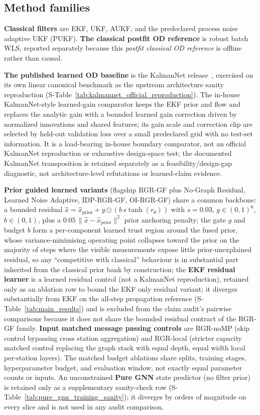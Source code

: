 \documentclass{article}
\begin{document}
\subsection{Method families}\label{sec:methods-families}
\textbf{Classical filters} are EKF, UKF, AUKF, and the predeclared process noise adaptive UKF (PUKF). \textbf{The classical postfit OD reference} is robust batch WLS, reported separately because this \emph{postfit classical OD reference} is offline rather than causal.

\textbf{The published learned OD baseline} is the KalmanNet release~\cite{revach2022kalmannet}, exercised on its own linear canonical benchmark as the upstream architecture sanity reproduction (S-Table~\ref{tab:kalmannet_official_reproduction}). The in-house KalmanNet-style learned-gain comparator keeps the EKF prior and flow and replaces the analytic gain with a bounded learned gain correction driven by normalized innovations and shared features; its gain scale and correction clip are selected by held-out validation loss over a small predeclared grid with no test-set information. It is a load-bearing in-house boundary comparator, not an official KalmanNet reproduction or exhaustive design-space test; the documented KalmanNet transposition is retained separately as a feasibility/design-gap diagnostic, not architecture-level refutations or learned-claim evidence.

\textbf{Prior guided learned variants} (flagship RGR-GF plus No-Graph Residual, Learned Noise Adaptive, IDP-RGR-GF, OI-RGR-GF) share a common backbone: a bounded residual \(\hat{x}=\hat{x}_{\mathrm{prior}}+g\odot(b\,s\tanh(r_\theta))\) with $s=0.03$, $g\in(0,1)^6$, $b\in(0,1)$, plus a $0.05\,\lVert\hat{x}-\hat{x}_{\mathrm{prior}}\rVert^2$ prior anchoring penalty; the gate $g$ and budget $b$ form a per-component learned trust region around the fused prior, whose variance-minimising operating point collapses toward the prior on the majority of steps where the visible measurements expose little prior-unexplained residual, so any ``competitive with classical'' behaviour is in substantial part inherited from the classical prior bank by construction; the \textbf{EKF residual learner} is a learned residual control (not a KalmanNet reproduction), retained only as an ablation row to bound the EKF only residual variant; it diverges substantially from EKF on the all-step propagation reference (S-Table~\ref{tab:main_results}) and is excluded from the claim audit's pairwise comparisons because it does not share the bounded residual contract of the RGR-GF family. \textbf{Input matched message passing controls} are RGR-noMP (skip control bypassing cross station aggregation) and RGR-local (stricter capacity matched control replacing the graph stack with equal depth, equal width local per-station layers). The matched budget ablations share splits, training stages, hyperparameter budget, and evaluation window, not exactly equal parameter counts or inputs. An unconstrained \textbf{Pure GNN} state predictor (no filter prior) is retained only as a supplementary sanity-check row (S-Table~\ref{tab:pure_gnn_training_sanity}); it diverges by orders of magnitude on every slice and is not used in any audit comparison.
\end{document}
